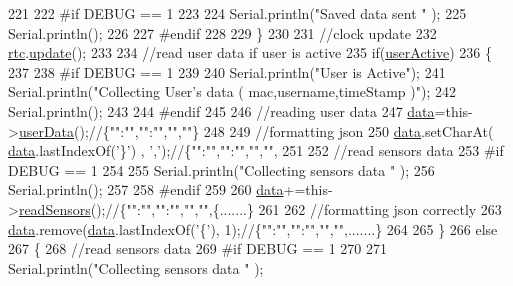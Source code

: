 \begin{DoxyCode}
221     
222 \textcolor{preprocessor}{    #if DEBUG == 1}
223 
224         Serial.println(\textcolor{stringliteral}{"Saved data sent "} );
225         Serial.println();
226     
227 \textcolor{preprocessor}{    #endif}
228 
229     \}
230 
231     \textcolor{comment}{//clock update}
232     \hyperlink{classCoolBoard_a50d2a6716879d64a85f3c6b44ad63275}{rtc}.\hyperlink{classCoolTime_aae601f795452cfa48d9fb337aed483a8}{update}();
233 
234     \textcolor{comment}{//read user data if user is active}
235     \textcolor{keywordflow}{if}(\hyperlink{classCoolBoard_a6395459131d6889a3005f79c7a35e964}{userActive})
236     \{
237     
238 \textcolor{preprocessor}{    #if DEBUG == 1}
239 
240         Serial.println(\textcolor{stringliteral}{"User is Active"});
241         Serial.println(\textcolor{stringliteral}{"Collecting User's data ( mac,username,timeStamp )"});
242         Serial.println();
243     
244 \textcolor{preprocessor}{    #endif  }
245     
246         \textcolor{comment}{//reading user data}
247         \hyperlink{classCoolBoard_a427fb753dd8575bdf821c70a5c63d695}{data}=this->\hyperlink{classCoolBoard_ae7358fb6e623cfc81b775f5f1734909b}{userData}();\textcolor{comment}{//\{"":"","":"","",""\}}
248 
249         \textcolor{comment}{//formatting json }
250         \hyperlink{classCoolBoard_a427fb753dd8575bdf821c70a5c63d695}{data}.setCharAt( \hyperlink{classCoolBoard_a427fb753dd8575bdf821c70a5c63d695}{data}.lastIndexOf(\textcolor{charliteral}{'\}'}) , \textcolor{charliteral}{','});\textcolor{comment}{//\{"":"","":"","","",}
251                 
252         \textcolor{comment}{//read sensors data}
253 \textcolor{preprocessor}{    #if DEBUG == 1}
254 
255         Serial.println(\textcolor{stringliteral}{"Collecting sensors data "} );
256         Serial.println();
257     
258 \textcolor{preprocessor}{    #endif}
259 
260         \hyperlink{classCoolBoard_a427fb753dd8575bdf821c70a5c63d695}{data}+=this->\hyperlink{classCoolBoard_ad03abdce2e65f520bbf2cff0f2d083cf}{readSensors}();\textcolor{comment}{//\{"":"","":"","","",\{.......\}     }
261 
262         \textcolor{comment}{//formatting json correctly}
263         \hyperlink{classCoolBoard_a427fb753dd8575bdf821c70a5c63d695}{data}.remove(\hyperlink{classCoolBoard_a427fb753dd8575bdf821c70a5c63d695}{data}.lastIndexOf(\textcolor{charliteral}{'\{'}), 1);\textcolor{comment}{//\{"":"","":"","","",.......\}}
264                 
265     \}   
266     \textcolor{keywordflow}{else}
267     \{
268         \textcolor{comment}{//read sensors data}
269 \textcolor{preprocessor}{    #if DEBUG == 1}
270 
271         Serial.println(\textcolor{stringliteral}{"Collecting sensors data "} );

\end{DoxyCode}
